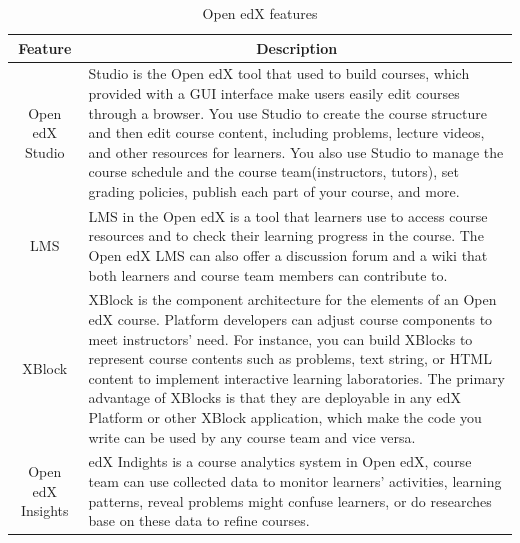 \begin{table}[H]
\centering
\begin{tabular}{|c|p{12cm}|}
\hline
Feature           & \multicolumn{1}{c|}{Description}                                                                                                                                                                                                                                                                                                                                                                                                                                                                                    \\ \hline
Open edX Studio   & Studio is the Open edX tool that used to build courses, which provided with a GUI interface make users easily edit courses through a browser. You use Studio to create the course structure and then edit course content, including problems, lecture videos, and other resources for learners. You also use Studio to manage the course schedule and the course team(instructors, tutors), set grading policies, publish each part of your course, and more.                                                       \\ \hline
LMS               & LMS in the Open edX is a tool that learners use to access course resources and to check their learning progress in the course. The Open edX LMS can also offer a discussion forum and a wiki that both learners and course team members can contribute to.                                                                                                                                                                                                                                                          \\ \hline
XBlock            & XBlock is the component architecture for the elements of an Open edX course. Platform developers can adjust course components to meet instructors' need. For instance, you can build XBlocks to represent course contents such as problems, text string, or HTML content to implement interactive learning laboratories. The primary advantage of XBlocks is that they are deployable in any edX Platform or other XBlock application, which make the code you write can be used by any course team and vice versa. \\ \hline
Open edX Insights & edX Indights is a course analytics system in Open edX, course team can use collected data to monitor learners' activities, learning patterns, reveal problems might confuse learners, or do researches base on these data to refine courses.                                                                                                                                                                                                                                                                        \\ \hline
\end{tabular}
\caption{Open edX features}
\label{table:edxfeature}
\end{table}


